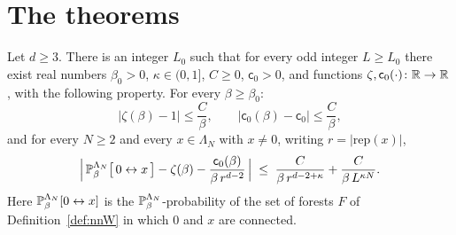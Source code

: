 \documentclass[11pt]{amsart}
\numberwithin{equation}{section}
\numberwithin{theorem}{section}
\newcommand{\conn}{\leftrightarrow}
\begin{document}
\section{The theorems}

\begin{theorem}[Connection probabilities at $h=0$]\label{thm:macro}
Let $d\ge3$. There is an integer $L_0$ such that for every odd integer $L\ge L_0$ there exist
real numbers $\beta_0>0$, $\kappa\in(0,1]$, $C\ge0$, $\mathsf c_0>0$, and functions
$\zeta,\mathsf c_0(\cdot)\colon\R\to\R$, with the following property. For every
$\beta\ge\beta_0$:
\begin{equation}\label{e:macro-const}
  |\zeta(\beta)-1|\le\frac{C}{\beta},\qquad |\mathsf c_0(\beta)-\mathsf c_0|\le\frac{C}{\beta},
\end{equation}
and for every $N\ge2$ and every $x\in\Lambda_N$ with $x\ne0$, writing $r=|\mathrm{rep}(x)|$,
\begin{equation}\label{e:macro}
  \Bigl|\,\P^{\Lambda_N}_{\beta}\bigl[\,0\conn x\,\bigr]-\zeta(\beta)-\frac{\mathsf c_0(\beta)}{\beta\,r^{d-2}}\,\Bigr|
  \;\le\;\frac{C}{\beta\, r^{d-2+\kappa}}+\frac{C}{\beta\,L^{\kappa N}} .
\end{equation}
Here $\P^{\Lambda_N}_\beta[0\conn x]$ is the $\P^{\Lambda_N}_\beta$-probability of the set of
forests $F$ of Definition~\ref{def:nnW} in which $0$ and $x$ are connected.
\end{theorem}
\end{document}
